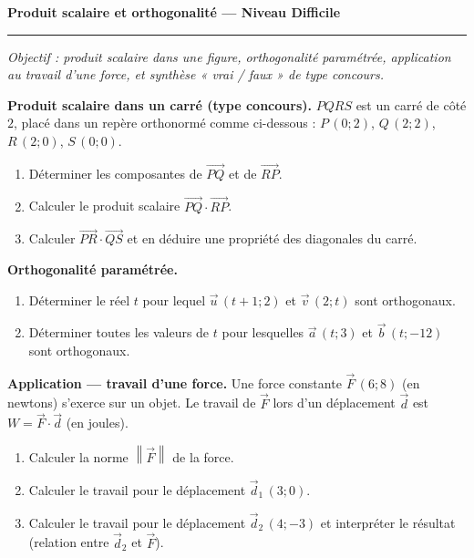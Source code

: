 \documentclass[11pt,a4paper]{article}
\newcommand{\vc}[1]{\overrightarrow{#1}}
\providecommand{\norm}[1]{\left\lVert #1\right\rVert}
\newcommand{\exo}[1]{\medskip\noindent{\color{primary}\bfseries\large Exercice #1.}\par\nopagebreak\smallskip}
\begin{document}
\begin{center}
{\LARGE\bfseries\color{primarydark}Produit scalaire et orthogonalité — Niveau Difficile}\\[2pt]
{\color{primary}\rule{0.55\linewidth}{1.1pt}}
\end{center}
\vspace{1mm}
{\small\itshape Objectif : produit scalaire dans une figure, orthogonalité paramétrée, application au
travail d'une force, et synthèse « vrai / faux » de type concours.}
\vspace{2mm}

\exo{1} \textbf{Produit scalaire dans un carré (type concours).}
$PQRS$ est un carré de côté $2$, placé dans un repère orthonormé comme ci-dessous :
$P\,(0;2)$, $Q\,(2;2)$, $R\,(2;0)$, $S\,(0;0)$.

\begin{center}
\end{center}

\begin{enumerate}[label=\textbf{\alph*)},leftmargin=2em,itemsep=3pt]
  \item Déterminer les composantes de $\vc{PQ}$ et de $\vc{RP}$.
  \item Calculer le produit scalaire $\vc{PQ}\cdot\vc{RP}$.
  \item Calculer $\vc{PR}\cdot\vc{QS}$ et en déduire une propriété des diagonales du carré.
\end{enumerate}

\exo{2} \textbf{Orthogonalité paramétrée.}
\begin{enumerate}[label=\textbf{\alph*)},leftmargin=2em,itemsep=3pt]
  \item Déterminer le réel $t$ pour lequel $\vec u\,(t+1;2)$ et $\vec v\,(2;t)$ sont orthogonaux.
  \item Déterminer toutes les valeurs de $t$ pour lesquelles $\vec a\,(t;3)$ et $\vec b\,(t;-12)$ sont
        orthogonaux.
\end{enumerate}

\exo{3} \textbf{Application — travail d'une force.}
Une force constante $\vec F\,(6;8)$ (en newtons) s'exerce sur un objet. Le travail de $\vec F$ lors
d'un déplacement $\vec d$ est $W=\vec F\cdot\vec d$ (en joules).
\begin{enumerate}[label=\textbf{\alph*)},leftmargin=2em,itemsep=3pt]
  \item Calculer la norme $\norm{\vec F}$ de la force.
  \item Calculer le travail pour le déplacement $\vec d_1\,(3;0)$.
  \item Calculer le travail pour le déplacement $\vec d_2\,(4;-3)$ et interpréter le résultat
        (relation entre $\vec d_2$ et $\vec F$).
\end{enumerate}
\end{document}
